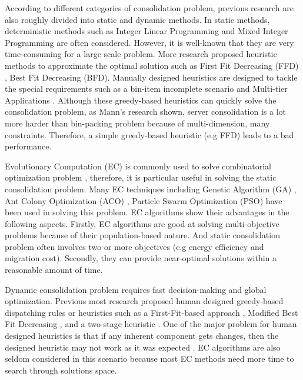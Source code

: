 According to different categories of consolidation problem, previous research are also roughly divided into static and dynamic methods. In static methods, deterministic methods such as  
Integer Linear Programming \cite{Speitkamp:2010ck} and Mixed
Integer Programming \cite{Wang:2016eh} are often considered. However, it is well-known that they are very time-consuming for a large scale problem. More research proposed heuristic methods
 to approximate the optimal solution such as 
First Fit Decreasing (FFD) \cite{Panigrahy:2011wk}, Best Fit Decreasing (BFD).
Manually designed heuristics are designed to tackle the special requirements such 
as a bin-item incomplete scenario \cite{Gupta:2008ul} and Multi-tier Applications \cite{Jung:2008vb, Li:2009wf}. Although these greedy-based heuristics can quickly solve the consolidation problem,  as Mann's research \cite{Mann:2015ua} shown, server consolidation is a lot more harder than bin-packing problem because of multi-dimension, many constraints. Therefore, a simple greedy-based heuristic (e.g FFD) leads to a bad performance. 

Evolutionary Computation (EC) is commonly used to solve combinatorial optimization problem \cite{Guzek:2015ds}, therefore, it is particular useful in solving the static consolidation problem.  Many EC techniques including Genetic Algorithm (GA) \cite{Xu:2010vh}, Ant Colony Optimization (ACO) \cite{Gao:2013gg, Mateos:2013bm}, Particle Swarm Optimization (PSO) \cite{Jeyarani:2012fg} have been used in solving this problem. EC algorithms show their advantages in the following aspects. Firstly, EC algorithms are good at solving multi-objective problems because of their population-based nature. And static consolidation problem often involves two or more objectives (e.g energy efficiency and migration cost). Secondly,  they can provide near-optimal solutions within a reasonable amount of time.  

Dynamic consolidation problem requires fast decision-making and global optimization. Previous most research proposed human designed greedy-based dispatching rules or heuristics such as a First-Fit-based approach \cite{Bobroff:2007ec}, Modified Best Fit Decreasing \cite{Beloglazov:2012ji}, and a two-stage heuristic \cite{Zhang:2015jm}. One of the major problem for human designed heuristics is that if any inherent component gets changes, then the designed heuristic may not work as it was expected \cite{SoteloFigueroa:2013be}. EC algorithms are also seldom considered in this scenario because most EC methods need more time to search through solutions space.